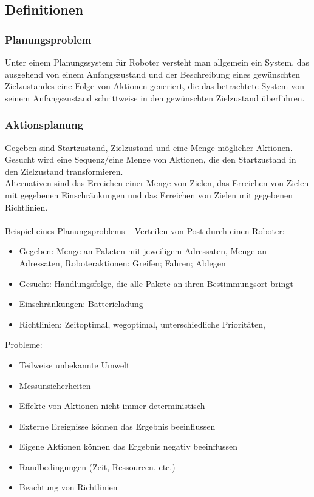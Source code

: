 \setlength\parindent{0pt}

\subsection{Definitionen}

\subsubsection{Planungsproblem}
Unter einem Planungssystem für Roboter versteht man allgemein ein System, das ausgehend von einem Anfangszustand und der Beschreibung eines gewünschten Zielzustandes eine Folge von Aktionen generiert, die das betrachtete System von seinem Anfangszustand schrittweise in den gewünschten Zielzustand überführen.

\subsubsection{Aktionsplanung}
Gegeben sind Startzustand, Zielzustand und eine Menge möglicher Aktionen.
Gesucht wird eine Sequenz/eine Menge von Aktionen, die den Startzustand in den Zielzustand transformieren.\\
Alternativen sind das Erreichen einer Menge von Zielen, das Erreichen von Zielen mit gegebenen Einschränkungen und das Erreichen von Zielen mit gegebenen Richtlinien.\\ \\
Beispiel eines Planungsproblems -- Verteilen von Post durch einen Roboter:
\begin{itemize}
	\item Gegeben: Menge an Paketen mit jeweiligem Adressaten, Menge an Adressaten, Roboteraktionen: Greifen; Fahren; Ablegen
	\item Gesucht: Handlungsfolge, die alle Pakete an ihren Bestimmungsort bringt
	\item Einschränkungen: Batterieladung
	\item Richtlinien: Zeitoptimal, wegoptimal, unterschiedliche Prioritäten,
\end{itemize}

Probleme:
\begin{itemize}
	\item Teilweise unbekannte Umwelt
	\item Messunsicherheiten
	\item Effekte von Aktionen nicht immer deterministisch
	\item Externe Ereignisse können das Ergebnis beeinflussen
	\item Eigene Aktionen können das Ergebnis negativ beeinflussen
	\item Randbedingungen (Zeit, Ressourcen, etc.)
	\item Beachtung von Richtlinien
\end{itemize}

